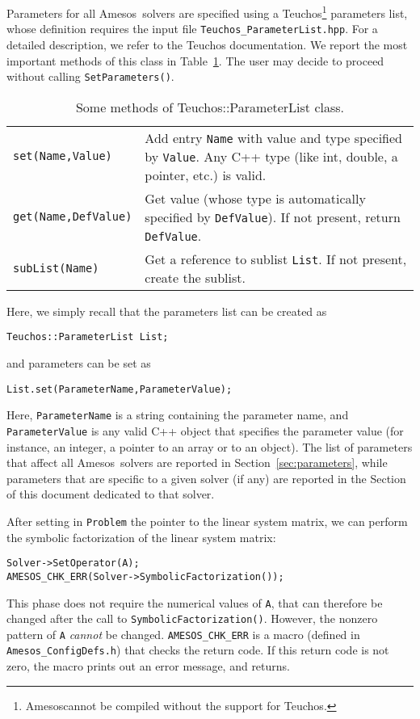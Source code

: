 \documentclass[11pt]{SANDreport}
\newcommand{\amesos}{{\sc Amesos}}
\newcommand{\teuchos}{{\sc Teuchos}}
\begin{document}
Parameters for all \amesos\ solvers are specified using a 
Teuchos\footnote{\amesos cannot be compiled without 
  the support for \teuchos.} 
parameters list, whose
definition requires the input file \verb!Teuchos_ParameterList.hpp!. For
a detailed description, we refer to the Teuchos documentation. We report
the most important methods of this class in Table~\ref{tab:teuchos}.
The user may decide to proceed without calling
\verb!SetParameters()!.

\begin{table}[htbp]
  \centering
  \begin{tabular}{| p{4cm} | p{10cm} |}
    \hline
    \verb!set(Name,Value)! & Add entry \verb!Name! with value and type
    specified by \verb!Value!. Any C++ type (like int, double, a
    pointer, etc.) is valid. \\
    \verb!get(Name,DefValue)! & Get value (whose type is automatically
    specified by \verb!DefValue!). If not present, return
    \verb!DefValue!. \\
    \verb!subList(Name)! & Get a reference to sublist \verb!List!. If not
    present, create the sublist. \\
    \hline
  \end{tabular}
  \caption{Some methods of Teuchos::ParameterList class.}
  \label{tab:teuchos}
\end{table}

Here, we simply recall that the parameters list can be created as
\begin{verbatim}
Teuchos::ParameterList List;
\end{verbatim}
and parameters can be set as
\begin{verbatim}
List.set(ParameterName,ParameterValue);
\end{verbatim}
Here, \verb!ParameterName! is a string containing the parameter name,
and \verb!ParameterValue! is any valid C++ object that specifies the
parameter value (for instance, an integer, a pointer to an array or to
an object). The list of parameters that affect all \amesos\ solvers are
reported in Section~\ref{sec:parameters}, while parameters that are specific
to a given solver (if any) are reported in the Section of this document
dedicated to that solver.

\medskip

After setting in \verb!Problem! the pointer to
the linear system matrix, we can perform the symbolic factorization
of the linear system matrix:
\begin{verbatim}
Solver->SetOperator(A);
AMESOS_CHK_ERR(Solver->SymbolicFactorization());
\end{verbatim}
This phase does not require the numerical values of \verb!A!, that can
therefore be changed after the call to \verb!SymbolicFactorization()!.
However,  the nonzero pattern of \verb!A! {\em cannot} be
changed.
\verb!AMESOS_CHK_ERR! is a macro (defined in \verb!Amesos_ConfigDefs.h!)
that checks the return code. If this return code is not zero, the
macro prints out an error message, and returns.
\end{document}
